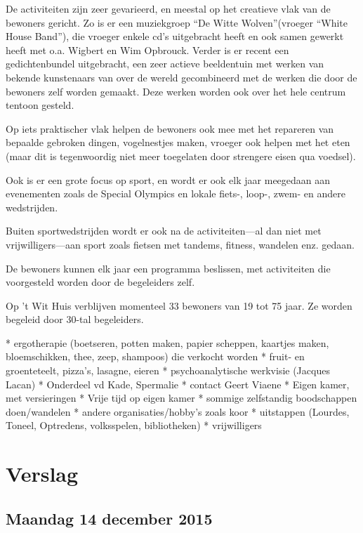 \documentclass[a4paper,12pt]{article}
\begin{document}
De activiteiten zijn zeer gevarieerd, en meestal op het creatieve vlak van de bewoners gericht. Zo is er een muziekgroep ``De Witte Wolven''(vroeger ``White House Band''), die vroeger enkele cd's uitgebracht heeft en ook samen gewerkt heeft met o.a. Wigbert en Wim Opbrouck. Verder is er recent een gedichtenbundel uitgebracht, een zeer actieve beeldentuin met werken van bekende kunstenaars van over de wereld gecombineerd met de werken die door de bewoners zelf worden gemaakt. Deze werken worden ook over het hele centrum tentoon gesteld.

Op iets praktischer vlak helpen de bewoners ook mee met het repareren van bepaalde gebroken dingen, vogelnestjes maken, vroeger ook helpen met het eten (maar dit is tegenwoordig niet meer toegelaten door strengere eisen qua voedsel).

Ook is er een grote focus op sport, en wordt er ook elk jaar meegedaan aan evenementen zoals de Special Olympics en lokale fiets-, loop-, zwem- en andere wedstrijden.

Buiten sportwedstrijden wordt er ook na de activiteiten---al dan niet met vrijwilligers---aan sport zoals fietsen met tandems, fitness, wandelen enz. gedaan.

De bewoners kunnen elk jaar een programma beslissen, met activiteiten die voorgesteld worden door de begeleiders zelf.

Op 't Wit Huis verblijven momenteel 33 bewoners van 19 tot 75 jaar. Ze worden begeleid door 30-tal begeleiders.

* ergotherapie (boetseren, potten maken, papier scheppen, kaartjes maken, bloemschikken, thee, zeep, shampoos) die verkocht worden
* fruit- en groenteteelt, pizza's, lasagne, eieren
* psychoanalytische werkvisie (Jacques Lacan)
* Onderdeel vd Kade, Spermalie
* contact Geert Viaene
* Eigen kamer, met versieringen
* Vrije tijd op eigen kamer
* sommige zelfstandig boodschappen doen/wandelen
* andere organisaties/hobby's zoals koor
* uitstappen (Lourdes, Toneel, Optredens, volksspelen, bibliotheken)
* vrijwilligers

\section{Verslag}


\subsection{Maandag 14 december 2015}
\end{document}
